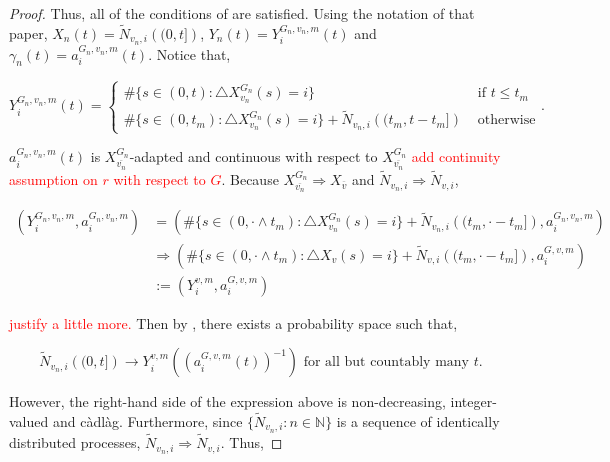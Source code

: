 \documentclass[12pt]{article}
\newcommand{\mb}{\mathbb}
\newcommand{\ra}{\rightarrow}
\newcommand{\ov}{\overline}
\newcommand{\te}{\text}
\newcommand{\tr}{\textcolor{red}}
\newcommand{\defeq}{:=}								%
\newcommand{\cl}[1]{\ov{#1}}						%
\newcommand{\Xf}{X}									%
\newcommand{\poiss}{N}								%
\newcommand{\rate}{r}								%
\newcommand{\poissv}[1]{_{#1}}						%
\newcommand{\vind}[1]{_{#1}}						%
\newcommand{\tme}[1]{(#1)}							%
\newcommand{\gind}[1]{^{#1}}						%
\newcommand{\stpara}[1]{_{#1}}						%
\newcommand{\compen}{a}								%
\newcommand{\binver}[1]{(#1)^{-1}}					%
\newcommand{\Xg}{Y}									%
\newcommand{\alt}[1]{\tilde{#1}}					%
\newcommand{\gvjpara}[3]{^{#1,#2,#3}}				%
\begin{document}
\begin{proof}
Thus, all of the conditions of \cite[Corollary 1.3]{Kur91} are satisfied. Using the notation of that paper, \(X_n(t) = \alt{\poiss}\poissv{v_n,i}\left((0,t]\right)\), \(Y_n(t) = \Xg\gvjpara{G_n}{v_n}{m}\stpara{i}\tme{t}\) and \(\gamma_n(t) = \compen\gvjpara{G_n}{v_n}{m}\stpara{i}\tme{t}\). Notice that,

\[\Xg\gvjpara{G_n}{v_n}{m}\stpara{i}\tme{t} = \begin{cases}
\#\{s \in (0,t): \triangle\Xf\gind{G_n}\vind{v_n}\tme{s} = i\} &\te{ if } t \leq t_m\\
\#\{s \in (0,t_m): \triangle\Xf\gind{G_n}\vind{v_n}\tme{s} = i\} + \alt{\poiss}\poissv{v_n,i}\left((t_m,t-t_m]\right) &\te{ otherwise}
\end{cases}.\]

\(\compen\gvjpara{G_n}{v_n}{m}\stpara{i}\tme{t}\) is \(\Xf\gind{G_n}\vind{\cl{v_n}}\)-adapted and continuous with respect to \(\Xf\gind{G_n}\vind{\cl{v_n}}\) \tr{add continuity assumption on \(\rate\) with respect to \(G\)}. Because \(\Xf\gind{G_n}\vind{\cl{v_n}} \Rightarrow \Xf\vind{\cl{v}}\) and \(\alt{\poiss}\poissv{v_n,i}\Rightarrow \alt{\poiss}\poissv{v,i}\),

\begin{align*}
\left(\Xg\gvjpara{G_n}{v_n}{m}\stpara{i},\compen\gvjpara{G_n}{v_n}{m}\stpara{i}\right) &= \left(\#\{s \in (0,\cdot\wedge t_m): \triangle\Xf\gind{G_n}\vind{v_n}\tme{s} = i\} + \alt{\poiss}\poissv{v_n,i}\left((t_m,\cdot-t_m]\right),\compen\gvjpara{G_n}{v_n}{m}\stpara{i}\right)\\
&\Rightarrow \left(\#\{s \in (0,\cdot\wedge t_m): \triangle\Xf\vind{v}\tme{s} = i\} + \alt{\poiss}\poissv{v,i}\left((t_m,\cdot-t_m]\right),\compen\gvjpara{G}{v}{m}\stpara{i}\right)\\
&\defeq \left(\Xg^{v,m}\stpara{i},\compen\gvjpara{G}{v}{m}\stpara{i}\right)
\end{align*}

\tr{justify a little more. }Then by \cite[Corollary 1.3]{Kur91}, there exists a probability space such that,

\[\alt{\poiss}\poissv{v_n,i}\left((0,t]\right) \ra \Xg^{v,m}\stpara{i}\left(\binver{\compen\gvjpara{G}{v}{m}\stpara{i}\left(t\right)}\right)\te{ for all but countably many }t.\]

However, the right-hand side of the expression above is non-decreasing, integer-valued and c\`adl\`ag. Furthermore, since \(\{\alt{\poiss}\poissv{v_n,i}:n\in\mb{N}\}\) is a sequence of identically distributed processes, \(\alt{\poiss}\poissv{v_n,i} \Rightarrow \alt{\poiss}\poissv{v,i}\). Thus, 


\end{proof}
\end{document}
